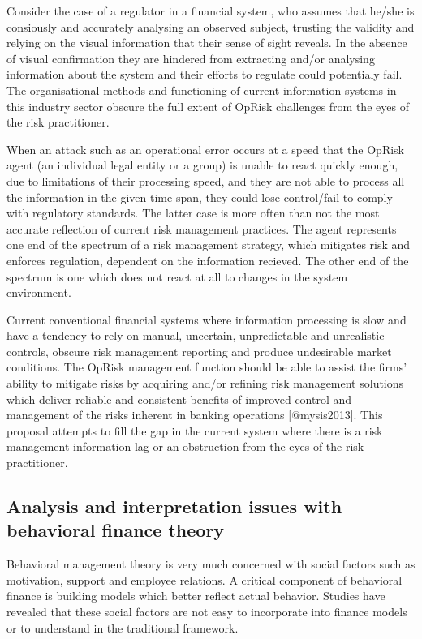 \documentclass[]{article}
\begin{document}
Consider the case of a regulator in a financial system, who assumes that
he/she is consiously and accurately analysing an observed subject,
trusting the validity and relying on the visual information that their
sense of sight reveals. In the absence of visual confirmation they are
hindered from extracting and/or analysing information about the system
and their efforts to regulate could potentialy fail. The organisational
methods and functioning of current information systems in this industry
sector obscure the full extent of OpRisk challenges from the eyes of the
risk practitioner.\medskip 

When an attack such as an operational error occurs at a speed that the
OpRisk agent (an individual legal entity or a group) is unable to react
quickly enough, due to limitations of their processing speed, and they
are not able to process all the information in the given time span, they
could lose control/fail to comply with regulatory standards. The latter
case is more often than not the most accurate reflection of current risk
management practices. The agent represents one end of the spectrum of a
risk management strategy, which mitigates risk and enforces regulation,
dependent on the information recieved. The other end of the spectrum is
one which does not react at all to changes in the system
environment.\medskip 

Current conventional financial systems where information processing is
slow and have a tendency to rely on manual, uncertain, unpredictable and
unrealistic controls, obscure risk management reporting and produce
undesirable market conditions. The OpRisk management function should be
able to assist the firms' ability to mitigate risks by acquiring and/or
refining risk management solutions which deliver reliable and consistent
benefits of improved control and management of the risks inherent in
banking operations {[}@mysis2013{]}. This proposal attempts to fill the
gap in the current system where there is a risk management information
lag or an obstruction from the eyes of the risk practitioner.

\subsection{Analysis and interpretation issues with behavioral finance theory}

Behavioral management theory is very much concerned with social factors
such as motivation, support and employee relations. A critical component
of behavioral finance is building models which better reflect actual
behavior. Studies have revealed that these social factors are not easy
to incorporate into finance models or to understand in the traditional
framework.\medskip 
\end{document}
